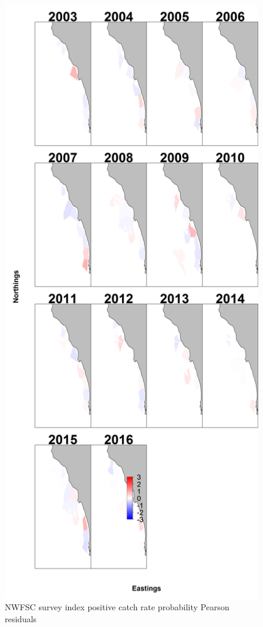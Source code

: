 \documentclass[12pt,]{article}
\begin{document}
\begin{figure}[htbp]
\centering
\includegraphics{Figures/Fleet8_catchrate_pearson.png}
\caption{NWFSC survey index positive catch rate probability Pearson
residuals \label{fig:Fleet8_catchrate_pearson}}
\end{figure}
\end{document}
